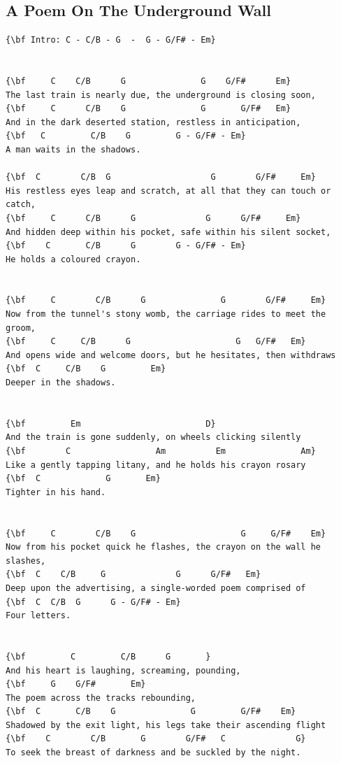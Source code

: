 \documentclass[a4paper]{article}
\begin{document}
\subsection{A Poem On The Underground Wall}
\begin{Verbatim}[commandchars=\\\{\}]
{\bf Intro: C - C/B - G  -  G - G/F# - Em}


{\bf     C    C/B      G               G    G/F#      Em}
The last train is nearly due, the underground is closing soon,
{\bf     C      C/B    G               G       G/F#   Em}
And in the dark deserted station, restless in anticipation,
{\bf   C         C/B    G         G - G/F# - Em}
A man waits in the shadows.

{\bf  C        C/B  G                    G        G/F#     Em}
His restless eyes leap and scratch, at all that they can touch or catch,
{\bf     C      C/B      G              G      G/F#     Em}
And hidden deep within his pocket, safe within his silent socket,
{\bf    C       C/B      G        G - G/F# - Em}
He holds a coloured crayon.


{\bf     C        C/B      G               G        G/F#     Em}
Now from the tunnel's stony womb, the carriage rides to meet the groom,
{\bf     C     C/B      G                     G   G/F#   Em}
And opens wide and welcome doors, but he hesitates, then withdraws
{\bf  C     C/B    G         Em}
Deeper in the shadows.


{\bf         Em                         D}
And the train is gone suddenly, on wheels clicking silently
{\bf        C                 Am          Em               Am}
Like a gently tapping litany, and he holds his crayon rosary
{\bf  C             G       Em}
Tighter in his hand.


{\bf     C        C/B    G                     G     G/F#    Em}
Now from his pocket quick he flashes, the crayon on the wall he slashes,
{\bf  C    C/B     G              G      G/F#   Em}
Deep upon the advertising, a single-worded poem comprised of
{\bf  C  C/B  G      G - G/F# - Em}
Four letters.


{\bf         C         C/B      G       }
And his heart is laughing, screaming, pounding, 
{\bf     G    G/F#       Em}
The poem across the tracks rebounding,
{\bf  C       C/B    G               G         G/F#    Em}
Shadowed by the exit light, his legs take their ascending flight
{\bf    C        C/B       G        G/F#   C              G}
To seek the breast of darkness and be suckled by the night.

\end{Verbatim}
\newpage
\end{document}
